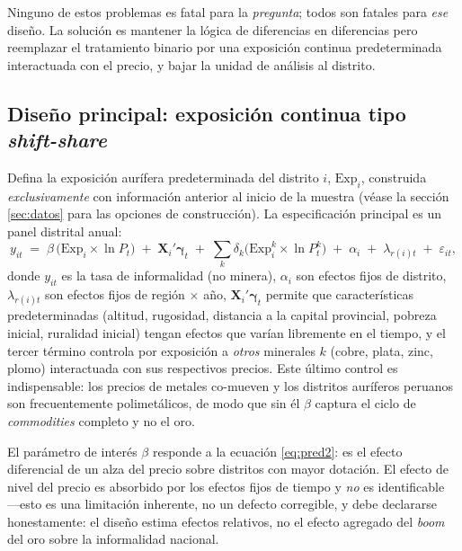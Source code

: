 \documentclass[11pt,a4paper]{article}
\newcommand{\Exp}{\mathrm{Exp}}
\begin{document}
Ninguno de estos problemas es fatal para la \emph{pregunta}; todos son fatales para \emph{ese} diseño. La solución es mantener la lógica de diferencias en diferencias pero reemplazar el tratamiento binario por una exposición continua predeterminada interactuada con el precio, y bajar la unidad de análisis al distrito.

\subsection{Diseño principal: exposición continua tipo \emph{shift-share}}

Defina la exposición aurífera predeterminada del distrito $i$, $\Exp_i$, construida \emph{exclusivamente} con información anterior al inicio de la muestra (véase la sección \ref{sec:datos} para las opciones de construcción). La especificación principal es un panel distrital anual:
\begin{equation}
y_{it} \;=\; \beta \,\bigl(\Exp_i \times \ln P_t\bigr) \;+\; \mathbf{X}_i' \boldsymbol{\gamma}_t \;+\; \sum_{k} \delta_k \bigl(\Exp^{k}_i \times \ln P^{k}_t\bigr) \;+\; \alpha_i \;+\; \lambda_{r(i)t} \;+\; \varepsilon_{it},
\label{eq:main}
\end{equation}
donde $y_{it}$ es la tasa de informalidad (no minera), $\alpha_i$ son efectos fijos de distrito, $\lambda_{r(i)t}$ son efectos fijos de región $\times$ año, $\mathbf{X}_i'\boldsymbol{\gamma}_t$ permite que características predeterminadas (altitud, rugosidad, distancia a la capital provincial, pobreza inicial, ruralidad inicial) tengan efectos que varían libremente en el tiempo, y el tercer término controla por exposición a \emph{otros} minerales $k$ (cobre, plata, zinc, plomo) interactuada con sus respectivos precios. Este último control es indispensable: los precios de metales co-mueven y los distritos auríferos peruanos son frecuentemente polimetálicos, de modo que sin él $\beta$ captura el ciclo de \emph{commodities} completo y no el oro.

El parámetro de interés $\beta$ responde a la ecuación \eqref{eq:pred2}: es el efecto diferencial de un alza del precio sobre distritos con mayor dotación. El efecto de nivel del precio es absorbido por los efectos fijos de tiempo y \emph{no} es identificable ---esto es una limitación inherente, no un defecto corregible, y debe declararse honestamente: el diseño estima efectos relativos, no el efecto agregado del \emph{boom} del oro sobre la informalidad nacional.
\end{document}
